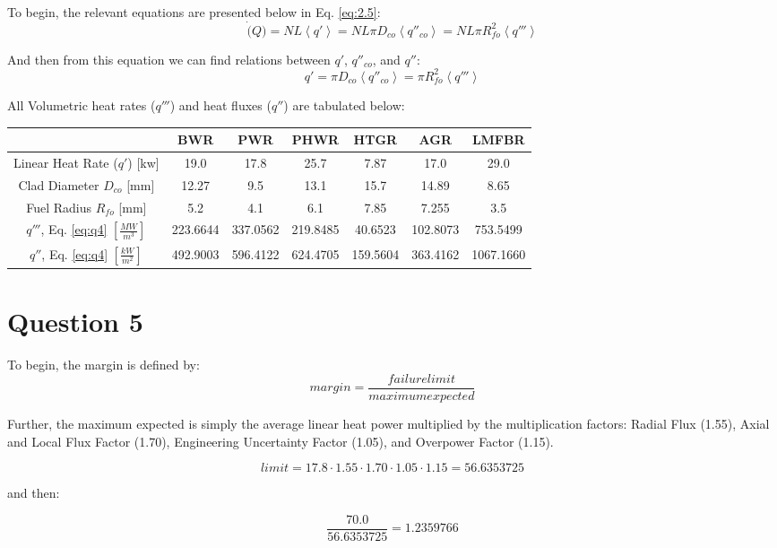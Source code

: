 \documentclass{article}
\begin{document}
To begin, the relevant equations are presented below in Eq. \ref{eq:2.5}:
\begin{equation}
    \Dot(Q) = NL \left< q' \right> = NL\pi D_{co} \left< q''_{co}\right> = NL\pi R_{fo}^2 \left< q''' \right>
    \label{eq:2.5}
\end{equation}

And then from this equation we can find relations between $q'$, $q''_{co}$, and $q''$:
\begin{equation}
    q' = \pi D_{co} \left< q''_{co} \right> = \pi R_{fo}^2 \left< q''' \right>
    \label{eq:q4}
\end{equation}

All Volumetric heat rates ($q'''$) and heat fluxes ($q''$) are tabulated below:
\vspace{20pt}

\begin{tabular}{|c|c|c|c|c|c|c|}
    \toprule
     & BWR & PWR & PHWR & HTGR & AGR & LMFBR \\
     \midrule
     Linear Heat Rate ($q'$) [kw] & 19.0 & 17.8 & 25.7 & 7.87 & 17.0 & 29.0\\
     Clad Diameter $D_{co}$ [mm] & 12.27 & 9.5 & 13.1 & 15.7 & 14.89 & 8.65\\
     Fuel Radius $R_{fo}$ [mm] & 5.2 & 4.1 & 6.1 & 7.85 & 7.255 & 3.5 \\ 
     \midrule
     $q'''$, Eq. \ref{eq:q4} $\left[\frac{MW}{m^3}\right]$ & 223.6644 & 337.0562 & 219.8485 &  40.6523 & 102.8073 & 753.5499 \\
     $q''$, Eq. \ref{eq:q4} $\left[\frac{kW}{m^2}\right]$ & 492.9003 &  596.4122 & 624.4705 & 159.5604 & 363.4162 & 1067.1660 \\ 
     \bottomrule
         
\end{tabular}

\vspace{20pt}
\section*{Question 5}

To begin, the margin is defined by:
\begin{equation}
    margin = \frac{failure limit}{maximum expected}
\end{equation}

Further, the maximum expected is simply the average linear heat power multiplied by the multiplication factors: Radial Flux (1.55), Axial and Local Flux Factor (1.70), Engineering Uncertainty Factor (1.05), and Overpower Factor (1.15).

\begin{equation}
    limit = 17.8 \cdot 1.55 \cdot 1.70 \cdot 1.05 \cdot 1.15 = 56.6353725
\end{equation}

and then: 

\begin{equation}
    \frac{70.0}{56.6353725} = 1.2359766
\end{equation}
\end{document}

